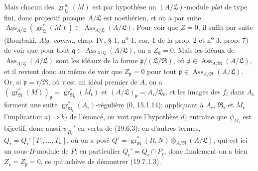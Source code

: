Mais chacun des $\operatorname{gr}_{\mathfrak L}^m(M)$ est par hypothèse un $(A/\mathfrak L)$-module \emph{plat} de type fini, donc projectif puisque $A/\mathfrak L$ est noethérien, et on a par suite $\operatorname{Ass}_{A/\mathfrak L}(\operatorname{gr}_{\mathfrak L}^*(M))\subset\operatorname{Ass}_{A/\mathfrak L}(A/\mathfrak L)$. Pour voir que $Z=0$, il suffit par suite (Bourbaki, \emph{Alg. comm.}, chap. IV, § 1, n\textsuperscript{o} 1, cor. 1 de la prop. 2 et n\textsuperscript{o} 3, prop. 7) de voir que pour tout $\mathfrak q\in\operatorname{Ass}_{A/\mathfrak L}(A/\mathfrak L)$, on a $Z_{\mathfrak q}=0$. Mais les idéaux de $\operatorname{Ass}_{A/\mathfrak L}(A/\mathfrak L)$ sont les idéaux de la forme $\mathfrak p/(\mathfrak L/\mathfrak R)$, où $\mathfrak p\in\operatorname{Ass}_{A/\mathfrak R}(A/\mathfrak L)$, et il revient donc au même de voir que $Z_{\mathfrak p}=0$ pour tout $\mathfrak p\in\operatorname{Ass}_{A/\mathfrak R}(A/\mathfrak L)$. Or, si $\mathfrak p=\mathfrak r/\mathfrak R$, où $\mathfrak r$ est un idéal premier de $A$, on a $(\operatorname{gr}_{\mathfrak R}^*(M))_{\mathfrak p}=\operatorname{gr}_{\mathfrak R_{\mathfrak r}}^*(M_{\mathfrak r})$ et $(A/\mathfrak L)_{\mathfrak p}=A_{\mathfrak r}/\mathfrak L_{\mathfrak r}$, et les images des $f_i$ dans $A_{\mathfrak r}$ forment une suite $\operatorname{gr}_{\mathfrak R_{\mathfrak r}}^*(A_{\mathfrak r})$-régulière ($0$, 15.1.14); appliquant à $A_{\mathfrak r}$, $\mathfrak R_{\mathfrak r}$ et $M_{\mathfrak r}$ l'implication $a)\Rightarrow b)$ de l'énoncé, on voit que l'hypothèse $d)$ entraîne que $\psi_{M_{\mathfrak r}}$ est bijectif, donc aussi $\psi_{R_{\mathfrak r}}'$ en vertu de (19.6.3); en d'autres termes, $Q_{\mathfrak r}=Q_{\mathfrak r}'[T_1,\ldots,T_n]$, où on a posé $Q'=\operatorname{gr}_{\mathfrak R}^*(R,N)\otimes_{A/\mathfrak R}(A/\mathfrak L)$, qui est ici un sous-$B$-module de $P$; en particulier $Q_{\mathfrak r}'=Q_{\mathfrak r}\cap P_{\mathfrak r}$, donc finalement on a bien $Z_{\mathfrak r}=Z_{\mathfrak p}=0$, ce qui achève de démontrer (19.7.1.3).

